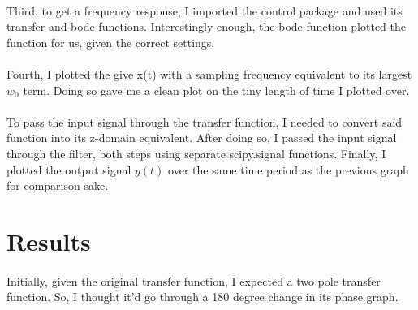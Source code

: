 \documentclass[12pt]{report}
\begin{document}
    \paragraph{} Third, to get a frequency response, I imported the control package and used its transfer and bode functions. Interestingly enough, the bode function plotted the function for us, given the correct settings. 
    
    \paragraph{} Fourth, I plotted the give x(t) with a sampling frequency equivalent to its largest $w_0$ term. Doing so gave me a clean plot on the tiny length of time I plotted over. 
    
    \paragraph{} To pass the input signal through the transfer function, I needed to convert said function into its z-domain equivalent. After doing so, I passed the input signal through the filter, both steps using separate scipy.signal functions. Finally, I plotted the output signal $y(t)$ over the same time period as the previous graph for comparison sake. 
    
\section{Results}

    
    \paragraph{} Initially, given the original transfer function, I expected a two pole transfer function. So, I thought it'd go through a 180 degree change in its phase graph.    
    
\end{document}

